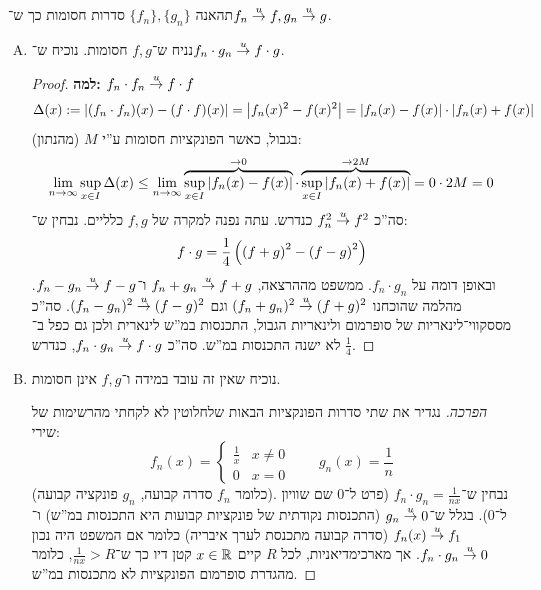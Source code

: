 \documentclass[]{../../../../tex/classes/homework}
\begin{document}
	\section{}
	תהאנה $\{f_n\}, \{g_n\}$ סדרות חסומות כך ש־$f_n \overset{u}{\to} f, g_n \overset{u}{\to} g$. 
	\begin{enumerate}[(A)]
		\item נניח ש־$f, g$ חסומות. נוכיח ש־$f_n \cdot g_n \overset{u}{\to} f \cdot g$. \begin{proof}\textbf{למה: $f_n \cdot f_n \overset{u}{\to} f \cdot f$}
			\[ \Delta(x) := \left \lvert (f_n\cdot f_n)(x) - (f \cdot f)(x) \right \rvert = \left \lvert f_n(x)^{2} - f(x)^{2} \right \rvert = \left \lvert f_n(x) - f(x) \right \rvert \cdot \left \lvert f_n(x) + f(x) \right \rvert \]
			בגבול, כאשר הפונקציות חסומות ע''י $M$ (מהנתון): 
			\[ \lim_{{n \to \infty}} \sup_{x \in I}\Delta(x) \le \lim_{{n \to \infty}} \overbrace{\sup_{x \in I}\left \lvert f_n(x) - f(x) \right \rvert}^{\to 0} \cdot \overbrace{\sup_{x \in I} \left \lvert f_n(x) + f(x) \right \rvert}^{\to 2M} = 0 \cdot 2M = 0 \]
			סה''כ $f_n^{2} \overset{u}{\to} f^{2}$ כנדרש. עתה נפנה למקרה של $f, g$ כלליים. נבחין ש־: 
			\[ f \cdot g = \frac{1}{4}\left ( \left ( f + g \right )^{2} - \left ( f - g \right )^{2} \right ) \]
			ובאופן דומה על $f_n \cdot g_n$. 	ממשפט מההרצאה, $f_n + g_n \overset{u}{\to} f + g$ ו־$f_n - g_n \overset{u}{\to} f - g$. מהלמה שהוכחנו $(f_n  +g_n)^{2} \overset{u}{\to} (f + g)^{2}$ וגם $(f_n - g_n)^{2} \overset{u}{\to} (f - g)^{2}$. סה''כ מססקווי־לינאריות של סופרמום ולינאריות הגבול, התכנסות במ''ש לינארית ולכן גם כפל ב־$\frac{1}{4}$ לא ישנה התכנסות במ''ש. סה''כ $f_n \cdot g_n \overset{u}{\to} f \cdot g$, כנדרש.
		\end{proof}
		\item נוכיח שאין זה עובד במידה ו־$f, g$ אינן חסומות. \begin{proof}[הפרכה]
			נגדיר את שתי סדרות הפונקציות הבאות שלחלוטין לא לקחתי מהרשימות של שירי: 
			\[ f_n(x) = \begin{cases}
				\frac{1}{x} & x \neq 0 \\
				0 & x = 0
			\end{cases} \quad \quad g_n(x) = \frac{1}{n} \]
			(כלומר $f_n$ סדרה קבועה, $g_n$ פונקציה קבועה). נבחין ש־$f_n \cdot g_n = \frac{1}{nx}$ (פרט ל־$0$ שם שוויון ל־$0$). בגלל ש־$g_n \overset{u}{\to} 0$ (התכנסות נקודתית של פונקציות קבועות היא התכנסות במ''ש) ו־$f_n(x) \overset{u}{\to} f_1$ (סדרה קבועה מתכנסת לערך איבריה) כלומר אם המשפט היה נכון $f_n \cdot g_n \overset{u}{\to} 0$. אך מארכימדיאניות, לכל $R$ קיים $x \in \mathbb{R}$ קטן דיו כך ש־$\frac{1}{nx} > R$, כלומר מהגדרת סופרמום הפונקציות לא מתכנסות במ''ש. 
		\end{proof}
	\end{enumerate}
	
	
	\ndoc
\end{document}

